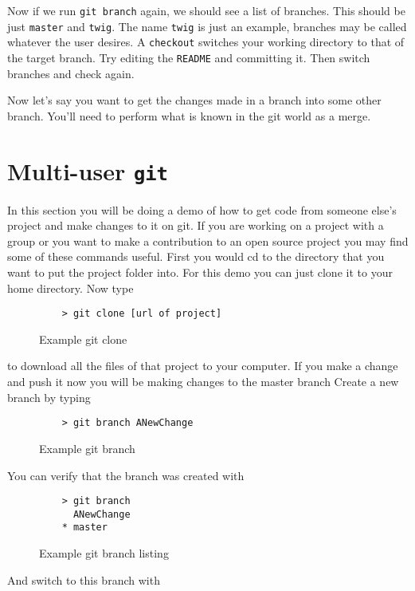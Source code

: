 \documentclass[11pt]{report}
\begin{document}
Now if we run \texttt{git branch} again, we should see a list of
branches. This should be just \texttt{master} and \texttt{twig}.
The name \texttt{twig} is just an example, branches may be called
whatever the user desires. A \texttt{checkout} switches your working
directory to that of the target branch. Try editing the \texttt{README}
and committing it. Then switch branches and check again.

Now let's say you want to get the changes made in a branch into some other
branch. You'll need to perform what is known in the git world as a merge.

\chapter{Multi-user \texttt{git}}
In this section you will be doing a demo of how to get code from
someone else's project and make changes to it on git. If you are
working on a project with a group or you want to make a contribution
to an open source project you may find some of these commands useful.
First you would cd to the directory that you want to put the project
folder into.  For this demo you can just clone it to your home
directory.  Now type
\begin{figure}[H]
  \caption{Example git clone}
  \begin{lstlisting}
    > git clone [url of project]
  \end{lstlisting}
\end{figure}

to download all the files of that project to your computer.  If you
make a change and push it now you will be making changes to the master
branch Create a new branch by typing

\begin{figure}[H]
  \caption{Example git branch}
  \begin{lstlisting}
    > git branch ANewChange
  \end{lstlisting}
\end{figure}

You can verify that the branch was created with

\begin{figure}[H]
  \caption{Example git branch listing}
  \begin{lstlisting}
    > git branch
      ANewChange
    * master
  \end{lstlisting}
\end{figure}

And switch to this branch with
\end{document}
